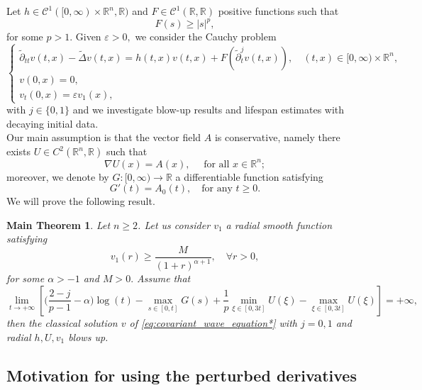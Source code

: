 \documentclass[11pt,reqno]{amsart}
\newtheorem*{theoreme}{Main Theorem}
\theoremstyle{definition}
\numberwithin{equation}{section}
\newcommand{\R}{\mathbb{R}}
\begin{document}
Let $h\in \mathcal{C}^1([0,\infty)\times \R^n,\R)$ and $F\in \mathcal{C}^1(\R,\R)$ positive functions such that\begin{equation}\label{eq:F_up}
F(s)\geq |s|^p,
\end{equation}
for some $p>1$.
Given $\varepsilon>0,$ we consider the Cauchy problem
\begin{equation}
\label{eq:covariant_wave_equation*}
\begin{cases}
\tilde\partial_{tt}v(t,x)- \tilde\Delta v(t,x)=h(t,x)v(t,x)+F(\tilde \partial_t^j v(t,x)), \quad (t,x)\in [0,\infty)\times \R^n, \\
v(0,x)=0,&\\
v_t(0,x)= \varepsilon v_1(x),&
\end{cases}
\end{equation}
%
with $j\in \{0,1\}$ and we investigate blow-up results and lifespan estimates with decaying initial data. \\
%
Our main assumption is that the vector field $A$ is conservative, namely there exists $U\in C^2(\R^n,\R)$ such that
%
\begin{equation}
\label{eq:potential}
    \nabla U(x)= A(x), \quad \text{ for all } x\in \R^n;
\end{equation}
moreover, we denote by $G:[0,\infty)\to \R$ a differentiable function satisfying 
\begin{equation}
\label{eq:Gdef}
G'(t)=A_0(t), \quad \text{for any } t\geq 0.
\end{equation}
%
We will prove the following result.
\begin{theoreme}
Let $n\geq 2$. Let us consider $v_1$ a radial smooth function satisfying 
\begin{equation}
    v_1(r)\geq \frac{M}{(1+r)^{\alpha+1}}, \quad \forall r>0,
\end{equation}
for some $\alpha>-1$ and $M>0.$ Assume that 
\begin{equation}
    \lim_{t\to+\infty} \left[\Big(\frac{2-j}{p-1}-\alpha\Big)\log(t)-\max_{s\in [0,t]}G(s)
    +\frac{1}{p} \min_{\xi\in [0,3t]} U\left(\xi\right) -\max_{\xi\in [0,3t]} U\left(\xi\right)\right]=+\infty,
\end{equation}
then the classical solution $v$ of \eqref{eq:covariant_wave_equation*}  with $j=0,1$ and radial $h,U,v_1$ blows up.
\end{theoreme}
%
\subsection{Motivation for using the perturbed derivatives}
\end{document}
